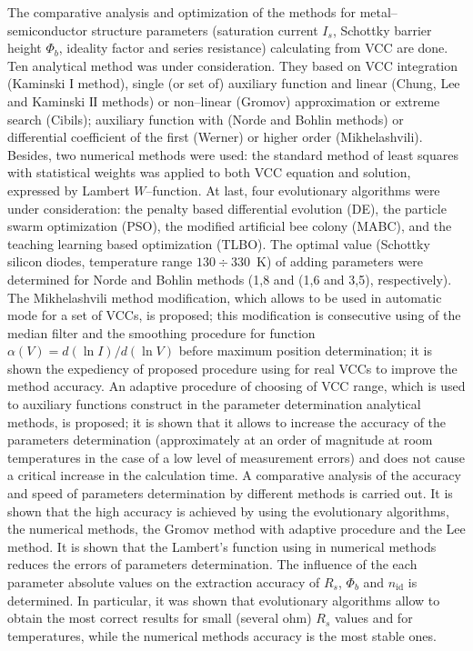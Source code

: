 The comparative analysis and optimization of the methods for metal--semiconductor structure parameters (saturation current $I_s$, Schottky barrier height $\Phi_b$, ideality factor and series resistance) calculating from VCC are done.
Ten analytical method was under consideration.
They based on VCC integration (Kaminski І method),
single (or set of) auxiliary function and linear (Chung, Lee and Kaminski ІІ methods) or non--linear (Gromov) approximation or extreme search  (Cibils);
 auxiliary function with (Norde and Bohlin methods) or differential coefficient of the first (Werner) or higher order (Mikhelashvili).
Besides, two numerical methods were used:
the standard method of least squares with statistical weights was applied to both VCC equation and solution, expressed by Lambert $W$--function.
At last, four evolutionary algorithms were under consideration: the penalty based differential evolution (DE), the particle swarm optimization (PSO), the modified artificial bee colony (MABC), and the teaching learning
based optimization (TLBO).
The optimal value (Schottky silicon diodes, temperature range $130\div330$~K) of adding parameters were determined
for Norde and Bohlin methods (1,8 and (1,6 and 3,5), respectively).
The Mikhelashvili method modification, which  allows to be used in automatic mode for a set of VCCs, is proposed;
this modification is consecutive using of the median filter and the smoothing procedure for
function $\alpha(V)=d(\ln I)/d(\ln V)$ before maximum position determination;
it is shown the expediency of proposed procedure using for real VCCs to improve the method accuracy.
An adaptive procedure of choosing of VCC range, which is used to auxiliary functions construct in the parameter determination analytical methods, is proposed;
it is shown that it allows to increase the accuracy of the parameters determination (approximately at an order of magnitude at room temperatures in the case of a low level of measurement errors) and does not cause a critical increase in the calculation time.
A comparative analysis of the accuracy and speed of parameters determination by different methods is carried out.
It is shown that the high accuracy is achieved by using the evolutionary algorithms, the numerical methods, the Gromov method with adaptive procedure and the Lee method.
It is shown that the Lambert's function using in numerical methods reduces the errors of parameters determination.
The influence of the each  parameter absolute values on the extraction accuracy of $R_s$, $\Phi_b$ and $n_\mathrm{id}$ is determined.
In particular, it was shown that evolutionary algorithms allow to obtain the most correct results for small (several ohm) $R_s$ values and for temperatures, while the numerical methods accuracy is the most stable ones.

